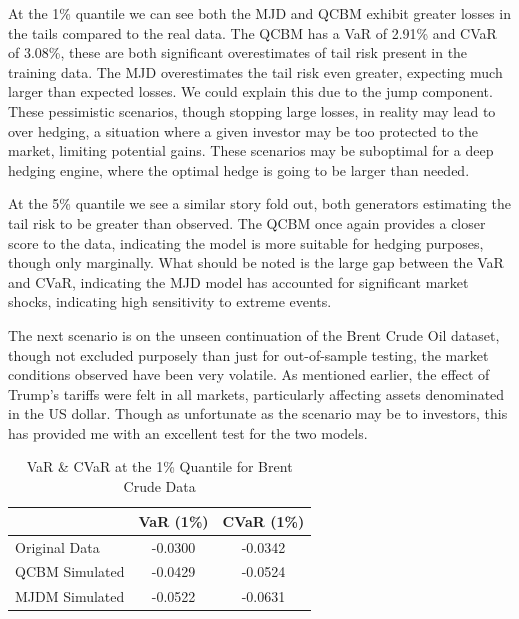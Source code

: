 \documentclass[12pt]{article}
\newcommand{\newp}
    {
    \vskip 0.5cm 
  }
\numberwithin{equation}{section}
\begin{document}
At the 1\% quantile we can see both
the MJD and QCBM exhibit greater losses in the tails compared to the real data.
The QCBM has a VaR of 2.91\% and CVaR of 3.08\%, these are both significant 
overestimates of tail risk present in the training data. The MJD overestimates 
the tail risk even greater, expecting much larger than expected losses. We could 
explain this due to the jump component. These pessimistic scenarios, though 
stopping large losses, in reality may lead to over hedging, a situation where a 
given investor may be too protected to the market, limiting potential gains. These 
scenarios may be suboptimal for a deep hedging engine, where the optimal hedge 
is going to be larger than needed. 
\newp 
At the 5\% quantile we see a similar story fold out, both generators estimating 
the tail risk to be greater than observed. The QCBM once again provides a closer 
score to the data, indicating the model is more suitable for hedging purposes, 
though only marginally. What should be noted is the large gap between the VaR 
and CVaR, indicating the MJD model has accounted for significant market shocks,
indicating high sensitivity to extreme events.\\
\newp 
The next scenario is on the unseen continuation of the Brent Crude Oil dataset,
though not excluded purposely than just for out-of-sample testing, the market 
conditions observed have been very volatile. As mentioned earlier, the effect of 
Trump's tariffs were felt in all markets, particularly affecting assets denominated 
in the US dollar. Though as unfortunate as the scenario may be to investors, this 
has provided me with an excellent test for the two models. 
\begin{table}[h!]
\centering
\begin{tabular}{lcc}
\hline
\textbf{} & \textbf{VaR (1\%)} & \textbf{CVaR (1\%)} \\
\hline
Original Data     & -0.0300 & -0.0342 \\
QCBM Simulated    & -0.0429 & -0.0524 \\
MJDM Simulated    & -0.0522 & -0.0631 \\
\hline
\end{tabular}
\caption{VaR \& CVaR at the 1\% Quantile for Brent Crude Data}
\label{tab:cvar_1_brent}
\end{table}
\end{document}
